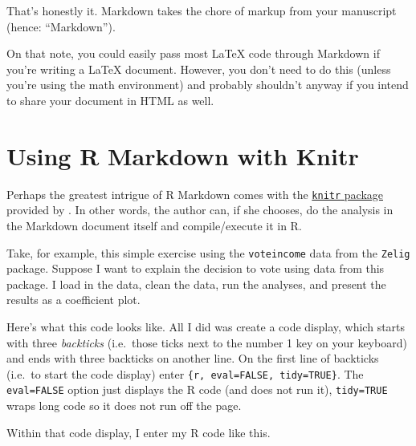 \documentclass[11pt,]{article}
\newenvironment{Shaded}{\begin{snugshade}}{\end{snugshade}}
\newcommand{\KeywordTok}[1]{\textcolor[rgb]{0.13,0.29,0.53}{\textbf{{#1}}}}
\newcommand{\DataTypeTok}[1]{\textcolor[rgb]{0.13,0.29,0.53}{{#1}}}
\newcommand{\StringTok}[1]{\textcolor[rgb]{0.31,0.60,0.02}{{#1}}}
\newcommand{\NormalTok}[1]{{#1}}
\begin{document}
That's honestly it. Markdown takes the chore of markup from your
manuscript (hence: ``Markdown'').

On that note, you could easily pass most LaTeX code through Markdown if
you're writing a LaTeX document. However, you don't need to do this
(unless you're using the math environment) and probably shouldn't anyway
if you intend to share your document in HTML as well.

\section{Using R Markdown with Knitr}\label{using-r-markdown-with-knitr}

Perhaps the greatest intrigue of R Markdown comes with the
\href{http://yihui.name/knitr/}{\texttt{knitr} package} provided by
\citet{xie2013ddrk}. In other words, the author can, if she chooses, do
the analysis in the Markdown document itself and compile/execute it in
R.

Take, for example, this simple exercise using the \texttt{voteincome}
data from the \texttt{Zelig} package. Suppose I want to explain the
decision to vote using data from this package. I load in the data, clean
the data, run the analyses, and present the results as a coefficient
plot.

Here's what this code looks like. All I did was create a code display,
which starts with three \emph{backticks} (i.e.~those ticks next to the
number 1 key on your keyboard) and ends with three backticks on another
line. On the first line of backticks (i.e.~to start the code display)
enter \texttt{\{r,\ eval=FALSE,\ tidy=TRUE\}}. The \texttt{eval=FALSE}
option just displays the R code (and does not run it),
\texttt{tidy=TRUE} wraps long code so it does not run off the page.

Within that code display, I enter my R code like this.

\begin{Shaded}
\end{Shaded}
\end{document}
